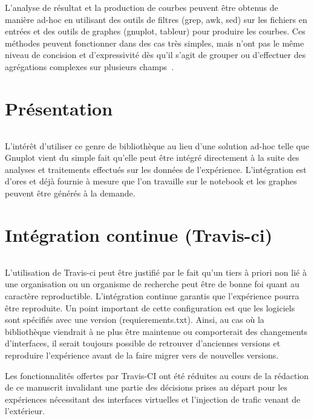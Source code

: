 L'analyse de résultat et la production de courbes peuvent être obtenus de manière ad-hoc en utilisant des outils de filtres (grep, awk, sed) sur les fichiers en entrées et des outils de graphes (gnuplot, tableur) pour produire les courbes.
Ces méthodes peuvent fonctionner dans des cas très simples, mais n'ont pas le même niveau de concision et d'expressivité dès qu'il s'agit de grouper ou d'effectuer des agrégations complexes sur plusieurs champs~\cite{racine2006gnuplot, williams2003gnuplot}.

\section{Présentation} %
\label{code:presentation}

\inputminted{python}{snippets/matplotlib.py}

L'intérêt d'utiliser ce genre de bibliothèque au lieu d'une solution ad-hoc telle que Gnuplot \cite{Gnuplot_4.4} vient du simple fait qu'elle peut être intégré directement à la suite des analyses et  traitements effectués sur les données de l'expérience. 
L'intégration est d'ores et déjà fournie à mesure que l'on travaille sur le notebook et les graphes peuvent être générés à la demande.

\section{Intégration continue (Travis-ci)} %
\label{code:ci}

\inputminted{yaml}{snippets/.travis.yml}

L'utilisation de Travis-ci peut être justifié par le fait qu'un tiers à priori non lié à une organisation ou un organisme de recherche peut être de bonne foi quant au caractère reproductible. 
L'intégration continue garantis que l'expérience pourra être reproduite.
Un point important de cette configuration est que les logiciels sont spécifiés avec une version (requierements.txt).
Ainsi, au cas où la bibliothèque viendrait à ne plus être maintenue ou comporterait des changements d'interfaces, il serait toujours possible de retrouver d'anciennes versions et reproduire l'expérience avant de la faire migrer vers de nouvelles versions.


Les fonctionnalités offertes par Travis-CI ont été réduites au cours de la rédaction de ce manuscrit invalidant une partie des décisions prises au départ pour les expériences nécessitant des interfaces virtuelles et l'injection de trafic venant de l'extérieur.


